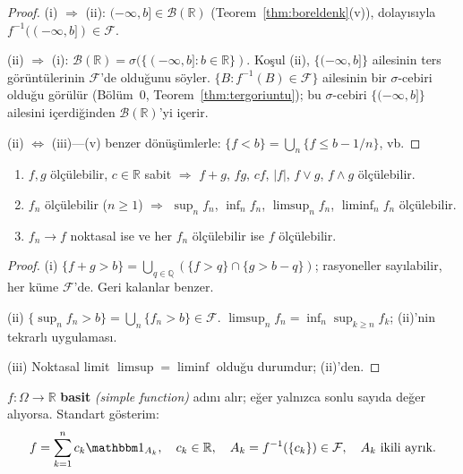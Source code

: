 \begin{proof}
(i) $\Rightarrow$ (ii): $(-\infty,b] \in \mathcal{B}(\mathbb{R})$
(Teorem~\ref{thm:boreldenk}(v)), dolayısıyla $f^{-1}((-\infty,b]) \in \mathcal{F}$.

(ii) $\Rightarrow$ (i): $\mathcal{B}(\mathbb{R}) = \sigma(\{(-\infty,b] : b \in \mathbb{R}\})$.
Koşul (ii), $\{(-\infty,b]\}$ ailesinin ters görüntülerinin $\mathcal{F}$'de
olduğunu söyler. $\{B : f^{-1}(B) \in \mathcal{F}\}$ ailesinin bir $\sigma$-cebiri
olduğu görülür (Bölüm~0, Teorem~\ref{thm:tergoriuntu}); bu $\sigma$-cebiri
$\{(-\infty,b]\}$ ailesini içerdiğinden $\mathcal{B}(\mathbb{R})$'yi içerir.

(ii) $\Leftrightarrow$ (iii)---(v) benzer dönüşümlerle: $\{f < b\} = \bigcup_n \{f \leq b - 1/n\}$, vb.
\end{proof}

\begin{onerme}\label{prop:olculebikarar}
\begin{enumerate}[label=(\roman*)]
  \item $f, g$ ölçülebilir, $c \in \mathbb{R}$ sabit $\Rightarrow$
        $f+g$, $fg$, $cf$, $|f|$, $f \vee g$, $f \wedge g$ ölçülebilir.
  \item $f_n$ ölçülebilir ($n \geq 1$) $\Rightarrow$
        $\sup_n f_n$, $\inf_n f_n$, $\limsup_n f_n$, $\liminf_n f_n$ ölçülebilir.
  \item $f_n \to f$ noktasal ise ve her $f_n$ ölçülebilir ise $f$ ölçülebilir.
\end{enumerate}
\end{onerme}

\begin{proof}
(i) $\{f + g > b\} = \bigcup_{q \in \mathbb{Q}} (\{f > q\} \cap \{g > b-q\})$;
rasyoneller sayılabilir, her küme $\mathcal{F}$'de. Geri kalanlar benzer.

(ii) $\{\sup_n f_n > b\} = \bigcup_n \{f_n > b\} \in \mathcal{F}$.
$\limsup_n f_n = \inf_n \sup_{k \geq n} f_k$; (ii)'nin tekrarlı uygulaması.

(iii) Noktasal limit $\limsup = \liminf$ olduğu durumdur; (ii)'den.
\end{proof}

\begin{tanim}\label{def:basit}
$f: \Omega \to \mathbb{R}$ \textbf{basit} \emph{(simple function)} adını alır; eğer
yalnızca sonlu sayıda değer alıyorsa. Standart gösterim:
\[
  f = \sum_{k=1}^n c_k \gostf{A_k},
  \quad c_k \in \mathbb{R},\quad A_k = f^{-1}(\{c_k\}) \in \mathcal{F},
  \quad A_k \text{ ikili ayrık.}
\]
\end{tanim}

